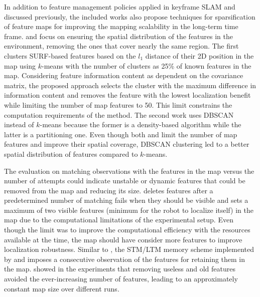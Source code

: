 In addition to feature management policies applied in keyframe SLAM and discussed previously, the included works also propose techniques for sparsification of feature maps for improving the mapping scalability in the long-term time frame.
\cite{hochdorfer-schlegel:2009} and \cite{hochdorfer-et-al:2009:5339626} focus on ensuring the spatial distribution of the features in the environment, removing the ones that cover nearly the same region.
The first clusters SURF-based features based on the $l_1$ distance of their 2D position in the map using $k$-means with the number of clusters as 25\% of known features in the map. Considering feature information content as dependent on the covariance matrix, the proposed approach selects the cluster with the maximum difference in information content and removes the feature with the lowest localization benefit while limiting the number of map features to 50. This limit constrains the computation requirements of the method. The second work uses DBSCAN instead of $k$-means because the former is a density-based algorithm while the latter is a partitioning one. Even though both \cite{hochdorfer-schlegel:2009} and \cite{hochdorfer-et-al:2009:5339626} limit the number of map features and improve their spatial coverage, DBSCAN clustering led to a better spatial distribution of features compared to $k$-means.

The evaluation on matching observations with the features in the map versus the number of attempts could indicate unstable or dynamic features that could be removed from the map and reducing its size.
\cite{davison-murray:2002:1017615} deletes features after a predetermined number of matching fails when they should be visible and sets a maximum of two visible features (minimum for the robot to localize itself) in the map due to the computational limitations of the experimental setup. Even though the limit was to improve the computational efficiency with the resources available at the time, the map should have consider more features to improve localization robustness.
Similar to \cite{davison-murray:2002:1017615}, the STM/LTM memory scheme implemented by \cite{dayoub-et-al:2011:013} and \cite{bacca-et-al:2013:003} imposes a consecutive observation of the features for retaining them in the map. \cite{bacca-et-al:2013:003} showed in the experiments that removing useless and old features avoided the ever-increasing number of features, leading to an approximately constant map size over different runs.

